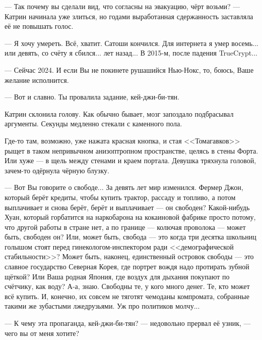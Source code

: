 --- Так почему вы сделали вид, что согласны на эвакуацию, чёрт возьми? ---
Катрин начинала уже злиться, но годами выработанная сдержанность заставляла её не повышать голос.

--- Я хочу умереть. Всё, хватит. Сатоши кончился. Для интернета я умер восемь... или девять, со счёту я сбился...
лет назад... В 2015-м, после падения TrueCrypt...

--- Сейчас 2024. И если Вы не покинете рушашийся Нью-Нокс, то, боюсь, Ваше желание исполнится.

--- Вот и славно. Ты провалила задание, кей-джи-би-тян.

\emptypar

Катрин склонила голову. Как обычно бывает, мозг запоздало подбрасывал аргументы. Секунды медленно стекали с каменного пола.

Где-то там, возможно, уже нажата красная кнопка, и стая <<Томагавков>> рыщет в таком непривычном анизоптропном пространстве,
целясь в стены Форта. Или хуже --- в щель между стенами и краем портала.
Девушка тряхнула головой, зачем-то одёрнула чёрную блузку.

--- Вот Вы говорите о свободе... За девять лет мир изменился.
Фермер Джон, который берёт кредиты, чтобы купить трактор, рассаду и топливо,
а потом выплачивает и снова берёт, берёт и выплачивает --- он свободен?
Какой-нибудь Хуан, который горбатится на наркобарона на кокаиновой фабрике просто потому,
что другой работы в стране нет, а по границе --- колючая проволока --- может быть, свободен он?
Или, может быть, свобода --- это когда три десятка школьниц голышом стоят перед гинекологом-инспектором ради
<<демографической стабильности>>?
Может быть, наконец, единственный островок свободы --- это славное государство Северная Корея,
где портрет вождя надо протирать зубной щёткой?
Или Ваша родная Япония, где воздух для дыхания покупают по счётчику, как воду?
А-а, знаю. Свободны те, у кого много денег. Те, кто может всё купить.
И, конечно, их совсем не тяготят чемоданы компромата, собранные такими же зубастыми лжедрузьями. Уж про политиков молчу...

--- К чему эта пропаганда, кей-джи-би-тян? --- недовольно прервал её узник, --- чего вы от меня хотите?

